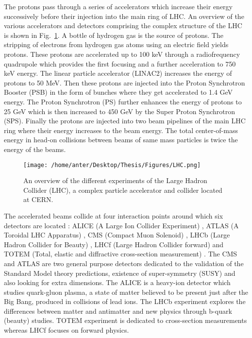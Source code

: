 The protons pass through a series of accelerators which increase their energy successively before their injection into the main ring of LHC. An overview of the various accelerators and detectors comprising the complex structure of the LHC is shown in Fig.~\ref{fig:LHC}. A bottle of hydrogen gas is the source of protons. The stripping of electrons from hydrogen gas atoms using an electric field yields protons. These protons are accelerated up to 100 keV through a radiofrequency quadrupole which provides the first focusing and a further acceleration to 750 keV energy. The linear particle accelerator (LINAC2) increases the energy of protons to 50 MeV. Then these protons are injected into the Proton Synchrotron Booster (PSB) in the form of bunches where they get accelerated to 1.4 GeV energy. The Proton Synchrotron (PS) further enhances the energy of protons to 25 GeV which is then increased to 450 GeV by the Super Proton Synchrotron (SPS). Finally the protons are injected into two beam pipelines of the main LHC ring where their energy increases to the beam energy. The total center-of-mass energy in head-on collisions between beams of same mass particles is twice the energy of the beams. 

\begin{figure}[!h]
 \begin{center} 
 \hspace*{-12mm}
 \vspace{4mm}
 \texttt{[image: /home/anter/Desktop/Thesis/Figures/LHC.png]}\\
 \vspace*{5mm}
 \caption[An overview of the different experiments of the Large Hadron Collider (LHC), a complex particle accelerator and collider located at CERN.]{An overview of the different experiments of the Large Hadron Collider (LHC), a complex particle accelerator and collider located at CERN\footnotemark.}
 \label{fig:LHC}
 \end{center}
\end{figure}

The accelerated beams collide at four interaction points around which six detectors are located : ALICE (A Large Ion Collider Experiment) \cite{Aamodt:2008zz}, ATLAS (A Toroidal LHC Apparatus) \cite{Aad:2008zzm}, CMS (Compact Muon Solenoid) \cite{Chatrchyan:2008aa,Bayatian:2006nff,Ball:2007zza}, LHCb (Large Hadron Collider for Beauty) \cite{Alves:2008zz}, LHCf (Large Hadron Collider forward)\cite{Adriani:2008zz} and TOTEM (Total, elastic and diffractive cross-section measurement) \cite{Anelli:2008zza}. The CMS and ATLAS are two general purpose detectors dedicated to the validation of the Standard Model theory predictions, existence of super-symmetry (SUSY) and also looking for extra dimensions. The ALICE is a heavy-ion detector which studies quark-gluon plasma, a state of matter believed to be present just after the Big Bang, produced in collisions of lead ions. The LHCb experiment explores the differences between matter and antimatter and new physics through b-quark (beauty) studies. TOTEM experiment is dedicated to cross-section measurements whereas LHCf focuses on forward physics. 


